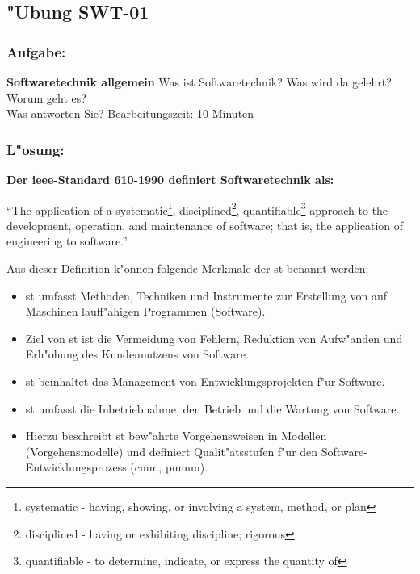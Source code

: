 \subsection{"Ubung SWT-01}
\subsubsection*{Aufgabe:}

\begin{framed}
\textbf{Softwaretechnik allgemein}
\smallbreak
Was ist Softwaretechnik? Was wird da gelehrt? Worum geht es?
\\
Was antworten Sie?
\bigbreak
\small Bearbeitungszeit: 10 Minuten
\end{framed}
\bigbreak
\bigbreak
\subsubsection*{L"osung:}

\textbf{Der \gls{ieee}-Standard 610-1990 definiert Softwaretechnik als:}


\begin{center}
\enquote{The application of a  systematic\footnote{\label{foot:1}systematic - having, showing, or involving a system, method, or plan}, disciplined\footnote{\label{foot:2}disciplined - having or exhibiting discipline; rigorous}, quantifiable\footnote{\label{foot:3}quantifiable - to determine, indicate, or express the quantity of} approach to the development, operation, and maintenance of software; that is, the application of engineering to software.}
\end{center}

\bigbreak
\bigbreak

Aus dieser Definition k"onnen folgende Merkmale der \gls{st} benannt werden:
\bigbreak
\begin{itemize}
\item \gls{st} umfasst Methoden, Techniken und Instrumente zur Erstellung von auf Maschinen lauff"ahigen Programmen (Software).
\item Ziel von \gls{st} ist die Vermeidung von Fehlern, Reduktion von Aufw"anden und Erh"ohung des Kundennutzens von Software.
\item \gls{st} beinhaltet das Management von Entwicklungsprojekten f"ur Software.
\item \gls{st} umfasst die Inbetriebnahme, den Betrieb und die Wartung von Software.
\item Hierzu beschreibt \gls{st} bew"ahrte Vorgehensweisen in Modellen (Vorgehensmodelle) und definiert Qualit"atsstufen f"ur den Software-Entwicklungsprozess (\gls{cmm}, \gls{pmmm}).
\end{itemize}

